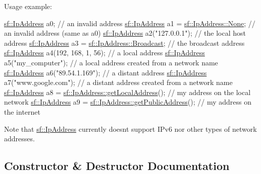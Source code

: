 Usage example\+: 
\begin{DoxyCode}
\hyperlink{classsf_1_1_ip_address}{sf::IpAddress} a0;                                     \textcolor{comment}{// an invalid address}
\hyperlink{classsf_1_1_ip_address}{sf::IpAddress} a1 = \hyperlink{classsf_1_1_ip_address_a4619b4abbe3c8fef056e7299db967404}{sf::IpAddress::None};               \textcolor{comment}{// an invalid address
       (same as a0)}
\hyperlink{classsf_1_1_ip_address}{sf::IpAddress} a2(\textcolor{stringliteral}{"127.0.0.1"});                        \textcolor{comment}{// the local host address}
\hyperlink{classsf_1_1_ip_address}{sf::IpAddress} a3 = \hyperlink{classsf_1_1_ip_address_aa93d1d57b65d243f2baf804b6035465c}{sf::IpAddress::Broadcast};          \textcolor{comment}{// the broadcast
       address}
\hyperlink{classsf_1_1_ip_address}{sf::IpAddress} a4(192, 168, 1, 56);                    \textcolor{comment}{// a local address}
\hyperlink{classsf_1_1_ip_address}{sf::IpAddress} a5(\textcolor{stringliteral}{"my\_computer"});                      \textcolor{comment}{// a local address created from a
       network name}
\hyperlink{classsf_1_1_ip_address}{sf::IpAddress} a6(\textcolor{stringliteral}{"89.54.1.169"});                      \textcolor{comment}{// a distant address}
\hyperlink{classsf_1_1_ip_address}{sf::IpAddress} a7(\textcolor{stringliteral}{"www.google.com"});                   \textcolor{comment}{// a distant address created from a
       network name}
\hyperlink{classsf_1_1_ip_address}{sf::IpAddress} a8 = \hyperlink{classsf_1_1_ip_address_a4c31622ad87edca48adbb8e8ed00ee4a}{sf::IpAddress::getLocalAddress}();  \textcolor{comment}{// my
       address on the local network}
\hyperlink{classsf_1_1_ip_address}{sf::IpAddress} a9 = \hyperlink{classsf_1_1_ip_address_a5c5cbf67e4aacf23c24f2ad991df4c55}{sf::IpAddress::getPublicAddress}(); \textcolor{comment}{// my
       address on the internet}
\end{DoxyCode}


Note that \hyperlink{classsf_1_1_ip_address}{sf\+::\+Ip\+Address} currently doesn\textquotesingle{}t support I\+Pv6 nor other types of network addresses. 

\subsection{Constructor \& Destructor Documentation}
\mbox{\label{classsf_1_1_ip_address_af32a0574baa0f46e48deb2d83ca7658b}} 
